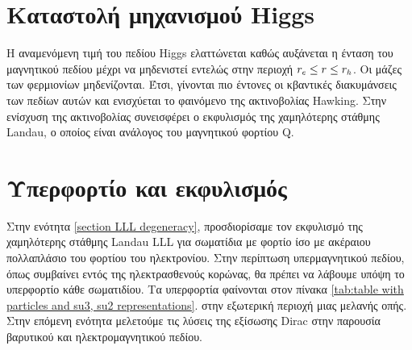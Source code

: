 \section{Καταστολή μηχανισμού Higgs}
Η αναμενόμενη τιμή του πεδίου Higgs ελαττώνεται καθώς αυξάνεται η ένταση του μαγνητικού πεδίου μέχρι να μηδενιστεί εντελώς στην περιοχή $r\subscr{e}\le r \le r\subscr{h}$. Οι μάζες των φερμιονίων μηδενίζονται.
Έτσι, γίνονται πιο έντονες οι κβαντικές διακυμάνσεις των πεδίων αυτών και ενισχύεται το φαινόμενο της
ακτινοβολίας Hawking. Στην ενίσχυση της ακτινοβολίας συνεισφέρει ο εκφυλισμός της χαμηλότερης στάθμης Landau,
ο οποίος είναι ανάλογος του μαγνητικού φορτίου Q. 

\section{Υπερφορτίο και εκφυλισμός}
Στην ενότητα \ref{section LLL degeneracy}, προσδιορίσαμε τον εκφυλισμό της χαμηλότερης στάθμης Landau LLL για σωματίδια με φορτίο ίσο με ακέραιου πολλαπλάσιο του φορτίου του ηλεκτρονίου. %
Στην περίπτωση υπερμαγνητικού πεδίου, όπως συμβαίνει εντός της ηλεκτρασθενούς κορώνας, θα πρέπει να λάβουμε υπόψη το υπερφορτίο κάθε σωματιδίου. 
Τα υπερφορτία φαίνονται στον πίνακα \ref{tab:table with particles and su3, su2 representations}. 
στην εξωτερική περιοχή μιας μελανής οπής. Στην επόμενη ενότητα μελετούμε τις λύσεις της εξίσωσης Dirac στην παρουσία βαρυτικού και ηλεκτρομαγνητικού πεδίου.

